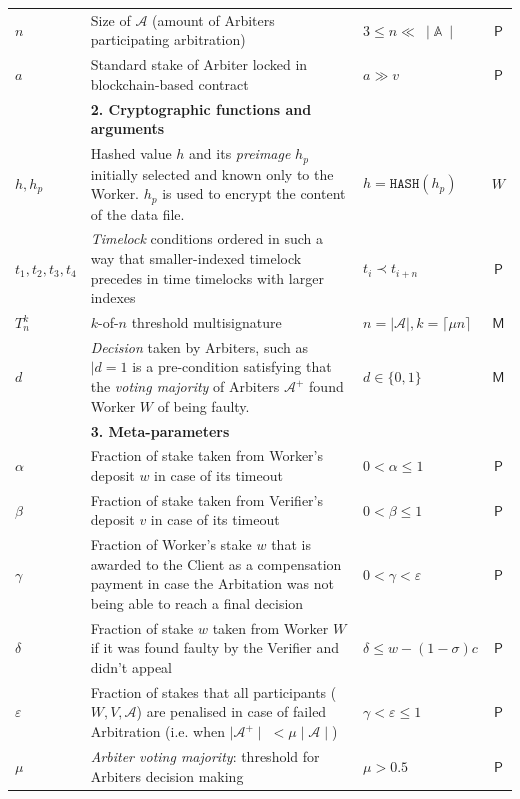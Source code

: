 \documentclass[a4paper]{article}
\begin{document}
\begin{table}[hp]
\begin{adjustbox}{center}
\begin{tabular}{@{} l m{11cm} m{2.5cm} c @{}}
            $n$ & Size of $\mathcal{A}$ (amount of Arbiters participating arbitration) & $3 \le n \ll\: \mid\mathbb{A}\:\mid$ & $\mathsf{P}$ \\
            $a$ & Standard stake of Arbiter locked in blockchain-based contract & $a \gg v$ & $\mathsf{P}$ \\
            \midrule
&\textbf{2. Cryptographic functions and arguments}\\
            $h, h_p$ & Hashed value $h$ and its \textit{preimage} $h_p$ initially selected and known only to the Worker. $h_p$ is used to encrypt the content of the data file. & $h = \mathtt{HASH}(h_p)$ & $W$ \\
            $t_1, t_2, t_3, t_4$ & \textit{Timelock} conditions ordered in such a way that smaller-indexed timelock precedes in time timelocks with larger indexes & $t_i \prec t_{i+n}$ & $\mathsf{P}$ \\
            $T^k_n$ & $k$-of-$n$ threshold multisignature & $n = \mid\mathcal{A}\mid, k = \lceil \mu n\rceil$ & $\mathsf{M}$ \\
            $d$ & \textit{Decision} taken by Arbiters, such as $\mid d=1$ is a pre-condition satisfying that the \textit{voting majority} of Arbiters $\mathcal{A^+}$ found Worker $W$ of being faulty. & $d \in \{0, 1\}$ & $\mathsf{M}$ \\
            \midrule
&\textbf{3. Meta-parameters}\\
            $\alpha$ & Fraction of stake taken from Worker's deposit $w$ in case of its timeout & $0 < \alpha \le 1$ & $\mathsf{P}$ \\
            $\beta$ & Fraction of stake taken from Verifier's deposit $v$ in case of its timeout & $0 < \beta \le 1$ & $\mathsf{P}$ \\
            $\gamma$ & Fraction of Worker's stake $w$ that is awarded to the Client as a compensation payment in case the Arbitation was not being able to reach a final decision & $0 < \gamma < \varepsilon$ & $\mathsf{P}$ \\
            $\delta$ & Fraction of stake $w$ taken from Worker $W$ if it was found faulty by the Verifier and didn't appeal & $\delta \le w-(1-\sigma)c$ & $\mathsf{P}$ \\
            $\varepsilon$ & Fraction of stakes that all participants ($W, V, \mathcal{A}$) are penalised in case of failed Arbitration (i.e. when $\mid\mathcal{A^+}\mid\; < \mu \mid\mathcal{A}\mid$) & $\gamma < \varepsilon \le 1$ & $\mathsf{P}$ \\
            $\mu$ & \textit{Arbiter voting majority}: threshold for Arbiters decision making & $\mu > 0.5$ & $\mathsf{P}$ \\

\end{tabular}
\end{adjustbox}
\end{table}
\end{document}
